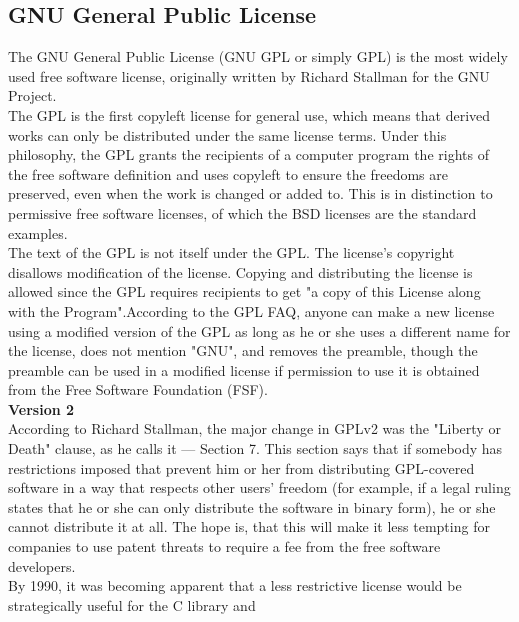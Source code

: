 \subsection{GNU General Public License}
\hspace*{0.82cm}The GNU General Public License (GNU GPL or simply GPL) is the most widely used free software license, originally written by 
Richard Stallman for the GNU Project.\\[0.5cm]
\hspace*{0.82cm}The GPL is the first copyleft license for general use, which means that derived works can only be distributed under the 
same license terms. Under this philosophy, the GPL grants the recipients of a computer program the rights of the free software definition 
and uses copyleft to ensure the freedoms are preserved, even when the work is changed or added to. This is in distinction to permissive 
free software licenses, of which the BSD licenses are the standard examples.\\[0.5cm]
\hspace*{0.82cm}The text of the GPL is not itself under the GPL. The license's copyright disallows modification of the license. Copying 
and distributing the license is allowed since the GPL requires recipients to get "a copy of this License along with the Program".According 
to the GPL FAQ, anyone can make a new license using a modified version of the GPL as long as he or she uses a different name for the license, 
does not mention "GNU", and removes the preamble, though the preamble can be used in a modified license if permission to use it is obtained 
from the Free Software Foundation (FSF).\\[0.5cm]
\textbf{Version 2}\\
\hspace*{0.82cm}According to Richard Stallman, the major change in GPLv2 was the "Liberty or Death" clause, as he calls it — Section 7. 
This section says that if somebody has restrictions imposed that prevent him or her from distributing GPL-covered software in a way that 
respects other users' freedom (for example, if a legal ruling states that he or she can only distribute the software in binary form), he 
or she cannot distribute it at all. The hope is, that this will make it less tempting for companies to use patent threats to require a fee 
from the free software developers.\\[0.5cm]
\hspace*{0.82cm}By 1990, it was becoming apparent that a less restrictive license would be strategically useful for the C library and 
